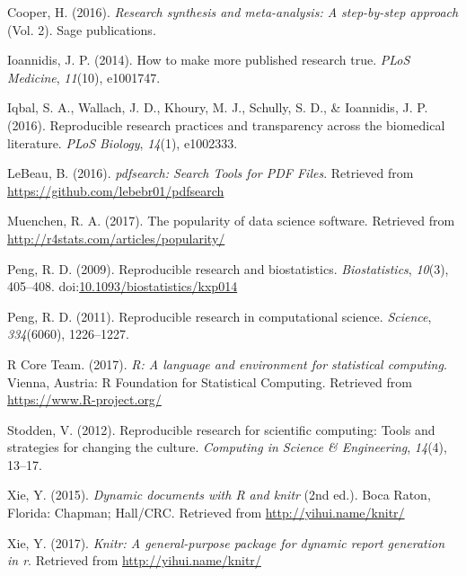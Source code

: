 \documentclass[english,man]{apa6}
\theoremstyle{definition}
\theoremstyle{definition}
\theoremstyle{remark}
\begin{document}
\hypertarget{ref-cooper2016}{}
Cooper, H. (2016). \emph{Research synthesis and meta-analysis: A
step-by-step approach} (Vol. 2). Sage publications.

\hypertarget{ref-ioannidis2014}{}
Ioannidis, J. P. (2014). How to make more published research true.
\emph{PLoS Medicine}, \emph{11}(10), e1001747.

\hypertarget{ref-iqbal2016}{}
Iqbal, S. A., Wallach, J. D., Khoury, M. J., Schully, S. D., \&
Ioannidis, J. P. (2016). Reproducible research practices and
transparency across the biomedical literature. \emph{PLoS Biology},
\emph{14}(1), e1002333.

\hypertarget{ref-pdfsearch}{}
LeBeau, B. (2016). \emph{pdfsearch: Search Tools for PDF Files}.
Retrieved from \url{https://github.com/lebebr01/pdfsearch}

\hypertarget{ref-muenchen}{}
Muenchen, R. A. (2017). The popularity of data science software.
Retrieved from \url{http://r4stats.com/articles/popularity/}

\hypertarget{ref-peng2009}{}
Peng, R. D. (2009). Reproducible research and biostatistics.
\emph{Biostatistics}, \emph{10}(3), 405--408.
doi:\href{https://doi.org/10.1093/biostatistics/kxp014}{10.1093/biostatistics/kxp014}

\hypertarget{ref-peng2011}{}
Peng, R. D. (2011). Reproducible research in computational science.
\emph{Science}, \emph{334}(6060), 1226--1227.

\hypertarget{ref-rpro}{}
R Core Team. (2017). \emph{R: A language and environment for statistical
computing}. Vienna, Austria: R Foundation for Statistical Computing.
Retrieved from \url{https://www.R-project.org/}

\hypertarget{ref-stodden2012}{}
Stodden, V. (2012). Reproducible research for scientific computing:
Tools and strategies for changing the culture. \emph{Computing in
Science \& Engineering}, \emph{14}(4), 13--17.

\hypertarget{ref-knitr}{}
Xie, Y. (2015). \emph{Dynamic documents with R and knitr} (2nd ed.).
Boca Raton, Florida: Chapman; Hall/CRC. Retrieved from
\url{http://yihui.name/knitr/}

\hypertarget{ref-knitrmanual}{}
Xie, Y. (2017). \emph{Knitr: A general-purpose package for dynamic
report generation in r}. Retrieved from \url{http://yihui.name/knitr/}
\end{document}
